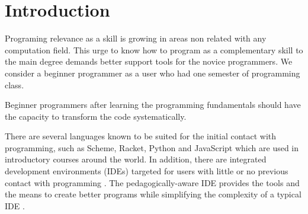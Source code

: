\section{Introduction}




Programing relevance as a skill is growing in areas non related with any computation field.  %
This urge to know how to program as a complementary skill %
to the main degree demands better support tools for the novice programmers. %
We consider a beginner programmer as a user who had one semester of programming class. %

Beginner programmers after learning the programming fundamentals should have the
capacity to transform the code systematically.

There are several languages known to be suited for the initial contact %
with programming, such as Scheme, Racket, Python and JavaScript which are used in introductory
courses around the world.
In addition, there are integrated development environments (IDEs) targeted for
 users with little or no previous contact with programming \cite{kolling2003bluej}. %
The pedagogically-aware %
 IDE provides the tools and the means to create better programs while simplifying
the complexity of a typical IDE \cite{pears2007survey}.%

